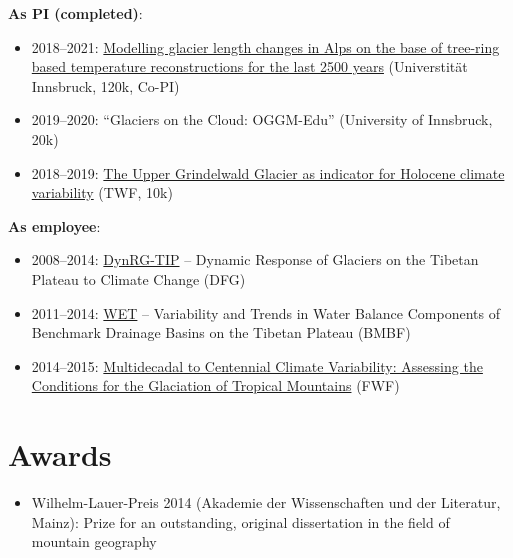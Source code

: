 \textbf{As PI (completed)}:
\begin{itemize}[nosep]
\item {} 
2018--2021: \href{https://www.uibk.ac.at/acinn/research/ice-and-climate/projects/modelling-glacier-length-changes.html.en}{Modelling glacier length changes in Alps on the base of tree-ring based temperature reconstructions for the last 2500 years} (Universtität Innsbruck, 120k\texteuro{}, Co-PI)

\item {} 
2019--2020: “Glaciers on the Cloud: OGGM-Edu” (University of Innsbruck, 20k\texteuro{})

\item {} 
2018--2019: \href{https://www.uibk.ac.at/acinn/research/ice-and-climate/projects/holocene-climate-variability.html.en}{The Upper Grindelwald Glacier as indicator for Holocene climate variability} (TWF, 10k\texteuro{})

\end{itemize}

\textbf{As employee}:
\begin{itemize}[nosep]
\item {} 
2008--2014: \href{https://www.klima.tu-berlin.de/index.php?show=reg\_klima\_hochasien\_dynrgtip\&lan=en}{DynRG-TIP} -- Dynamic Response of Glaciers on the Tibetan Plateau to Climate Change (DFG)

\item {} 
2011--2014: \href{https://www.klima.tu-berlin.de/index.php?show=reg\_klima\_hochasien\_wet\&lan=en}{WET} -- Variability and Trends in Water Balance Components of Benchmark Drainage Basins on the Tibetan Plateau (BMBF)

\item {} 
2014--2015: \href{https://www.uibk.ac.at/acinn/research/ice-and-climate/projects/glaciation-of-tropical-mountains.html.en}{Multidecadal to Centennial Climate Variability: Assessing the Conditions for the Glaciation of Tropical Mountains} (FWF)

\end{itemize}


\section*{Awards}
\label{\detokenize{ch08/cv:awards}}\begin{itemize}[nosep]
\item {} 
Wilhelm-Lauer-Preis 2014 (Akademie der Wissenschaften und der Literatur, Mainz): Prize for an outstanding,
original dissertation in the field of mountain geography

\end{itemize}


